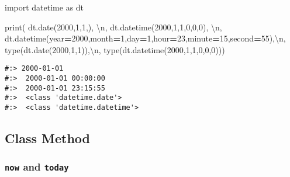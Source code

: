 \documentclass[
]{book}
\newenvironment{Shaded}{\begin{snugshade}}{\end{snugshade}}
\newcommand{\BuiltInTok}[1]{#1}
\newcommand{\CharTok}[1]{\textcolor[rgb]{0.5,0.5,0.5}{#1}}
\newcommand{\DecValTok}[1]{\textcolor[rgb]{0.06,0.06,0.06}{#1}}
\newcommand{\ImportTok}[1]{#1}
\newcommand{\NormalTok}[1]{#1}
\newcommand{\OperatorTok}[1]{\textcolor[rgb]{0.43,0.43,0.43}{\textbf{#1}}}
\newcommand{\StringTok}[1]{\textcolor[rgb]{0.5,0.5,0.5}{#1}}
\begin{document}
\begin{Shaded}
\begin{Highlighting}[]
\ImportTok{import}\NormalTok{ datetime }\ImportTok{as}\NormalTok{ dt}

\BuiltInTok{print}\NormalTok{( }
\NormalTok{    dt.date(}\DecValTok{2000}\NormalTok{,}\DecValTok{1}\NormalTok{,}\DecValTok{1}\NormalTok{,), }\StringTok{\textquotesingle{}}\CharTok{\textbackslash{}n}\StringTok{\textquotesingle{}}\NormalTok{,}
\NormalTok{    dt.datetime(}\DecValTok{2000}\NormalTok{,}\DecValTok{1}\NormalTok{,}\DecValTok{1}\NormalTok{,}\DecValTok{0}\NormalTok{,}\DecValTok{0}\NormalTok{,}\DecValTok{0}\NormalTok{), }\StringTok{\textquotesingle{}}\CharTok{\textbackslash{}n}\StringTok{\textquotesingle{}}\NormalTok{,}
\NormalTok{    dt.datetime(year}\OperatorTok{=}\DecValTok{2000}\NormalTok{,month}\OperatorTok{=}\DecValTok{1}\NormalTok{,day}\OperatorTok{=}\DecValTok{1}\NormalTok{,hour}\OperatorTok{=}\DecValTok{23}\NormalTok{,minute}\OperatorTok{=}\DecValTok{15}\NormalTok{,second}\OperatorTok{=}\DecValTok{55}\NormalTok{),}\StringTok{\textquotesingle{}}\CharTok{\textbackslash{}n}\StringTok{\textquotesingle{}}\NormalTok{,}
    \BuiltInTok{type}\NormalTok{(dt.date(}\DecValTok{2000}\NormalTok{,}\DecValTok{1}\NormalTok{,}\DecValTok{1}\NormalTok{)),}\StringTok{\textquotesingle{}}\CharTok{\textbackslash{}n}\StringTok{\textquotesingle{}}\NormalTok{,}
    \BuiltInTok{type}\NormalTok{(dt.datetime(}\DecValTok{2000}\NormalTok{,}\DecValTok{1}\NormalTok{,}\DecValTok{1}\NormalTok{,}\DecValTok{0}\NormalTok{,}\DecValTok{0}\NormalTok{,}\DecValTok{0}\NormalTok{)))}
\end{Highlighting}
\end{Shaded}

\begin{verbatim}
#:> 2000-01-01 
#:>  2000-01-01 00:00:00 
#:>  2000-01-01 23:15:55 
#:>  <class 'datetime.date'> 
#:>  <class 'datetime.datetime'>
\end{verbatim}

\hypertarget{class-method-1}{%
\subsection{Class Method}\label{class-method-1}}

\hypertarget{now-and-today}{%
\subsubsection{\texorpdfstring{\texttt{now} and \texttt{today}}{now and today}}\label{now-and-today}}
\end{document}
